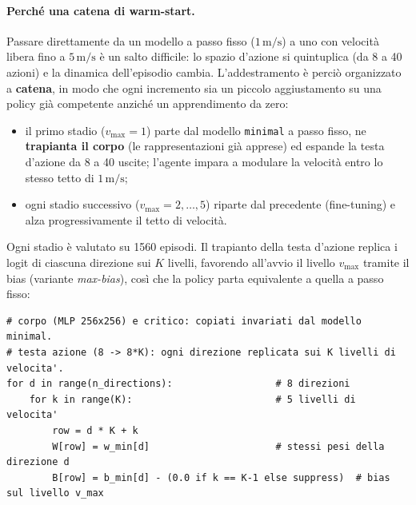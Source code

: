 \paragraph{Perch\'e una catena di warm-start.} Passare direttamente da un modello a passo
fisso ($1\,\text{m/s}$) a uno con velocit\`a libera fino a $5\,\text{m/s}$ \`e un salto
difficile: lo spazio d'azione si quintuplica (da 8 a 40 azioni) e la dinamica
dell'episodio cambia. L'addestramento \`e perci\`o organizzato a \textbf{catena}, in modo
che ogni incremento sia un piccolo aggiustamento su una policy gi\`a competente anzich\'e
un apprendimento da zero:
\begin{itemize}[leftmargin=1.4em, itemsep=2pt]
    \item il primo stadio ($v_{\max}{=}1$) parte dal modello \texttt{minimal} a passo
          fisso, ne \textbf{trapianta il corpo} (le rappresentazioni gi\`a apprese) ed
          espande la testa d'azione da 8 a 40 uscite; l'agente impara a modulare la
          velocit\`a entro lo stesso tetto di $1\,\text{m/s}$;
    \item ogni stadio successivo ($v_{\max}{=}2,\ldots,5$) riparte dal precedente
          (fine-tuning) e alza progressivamente il tetto di velocit\`a.
\end{itemize}
Ogni stadio \`e valutato su 1560 episodi. Il trapianto della testa d'azione replica i logit
di ciascuna direzione sui $K$ livelli, favorendo all'avvio il livello $v_{\max}$ tramite il
bias (variante \emph{max-bias}), cos\`i che la policy parta equivalente a quella a passo
fisso:

\begin{lstlisting}
# corpo (MLP 256x256) e critico: copiati invariati dal modello minimal.
# testa azione (8 -> 8*K): ogni direzione replicata sui K livelli di velocita'.
for d in range(n_directions):                  # 8 direzioni
    for k in range(K):                         # 5 livelli di velocita'
        row = d * K + k
        W[row] = w_min[d]                      # stessi pesi della direzione d
        B[row] = b_min[d] - (0.0 if k == K-1 else suppress)  # bias sul livello v_max
\end{lstlisting}

